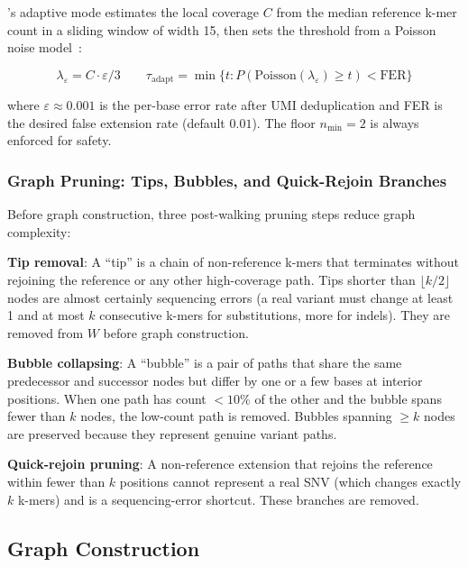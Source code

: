 \kmerdet{}'s adaptive mode estimates the local coverage $C$ from the median
reference k-mer count in a sliding window of width 15, then sets the threshold
from a Poisson noise model~\cite{kelley2010quake,guo2024statistically}:

\begin{equation}
  \lambda_{\varepsilon} = C \cdot \varepsilon / 3
  \qquad
  \tau_{\text{adapt}} = \min\!\bigl\{t : P(\text{Poisson}(\lambda_\varepsilon) \geq t) < \mathrm{FER}\bigr\}
  \label{eq:adaptive}
\end{equation}

where $\varepsilon \approx 0.001$ is the per-base error rate after UMI
deduplication and FER is the desired false extension rate (default $0.01$).
The floor $n_{\min} = 2$ is always enforced for safety.

\subsubsection{Graph Pruning: Tips, Bubbles, and Quick-Rejoin Branches}
\label{sec:pruning}

Before graph construction, three post-walking pruning steps reduce graph complexity:

\textbf{Tip removal}: A ``tip'' is a chain of non-reference k-mers that
terminates without rejoining the reference or any other high-coverage path.
Tips shorter than $\lfloor k/2 \rfloor$ nodes are almost certainly sequencing
errors (a real variant must change at least 1 and at most $k$ consecutive k-mers
for substitutions, more for indels).  They are removed from $W$ before graph
construction.

\textbf{Bubble collapsing}: A ``bubble'' is a pair of paths that share the same
predecessor and successor nodes but differ by one or a few bases at interior
positions.  When one path has count $<10\%$ of the other and the bubble spans
fewer than $k$ nodes, the low-count path is removed.  Bubbles spanning $\geq k$
nodes are preserved because they represent genuine variant paths.

\textbf{Quick-rejoin pruning}: A non-reference extension that rejoins the
reference within fewer than $k$ positions cannot represent a real SNV (which
changes exactly $k$ k-mers) and is a sequencing-error shortcut.  These branches
are removed.

\subsection{Graph Construction}
\label{sec:graph}

